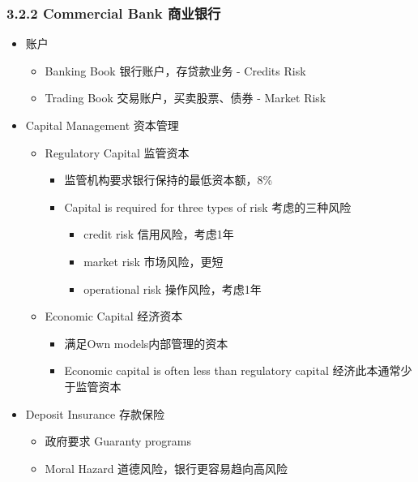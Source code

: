\documentclass[a4paper,6pt,twoside,openany]{article}
\begin{document}
\subsubsection*{3.2.2 Commercial Bank 商业银行}
\begin{itemize}
\item 账户
  \begin{itemize}
  \item  Banking Book 银行账户，存贷款业务 - Credits Risk
  \item Trading Book 交易账户，买卖股票、债券 - Market Risk
  \end{itemize}
\item Capital Management 资本管理
  \begin{itemize}
  \item Regulatory Capital 监管资本
    \begin{itemize}
    \item 监管机构要求银行保持的最低资本额，8\%
    \item Capital is required for three types of risk 考虑的三种风险
      \begin{itemize}
      \item credit risk 信用风险，考虑1年
      \item market risk 市场风险，更短
      \item operational risk 操作风险，考虑1年
      \end{itemize}
    \end{itemize}
  \item Economic Capital 经济资本
    \begin{itemize}
    \item 满足Own models内部管理的资本
      \item Economic capital is often less than regulatory capital 经济此本通常少于监管资本
    \end{itemize}
     \end{itemize}
\item Deposit Insurance 存款保险
  \begin{itemize}
  \item 政府要求 Guaranty programs
  \item Moral Hazard 道德风险，银行更容易趋向高风险
  \end{itemize}
\end{itemize}
\end{document}
